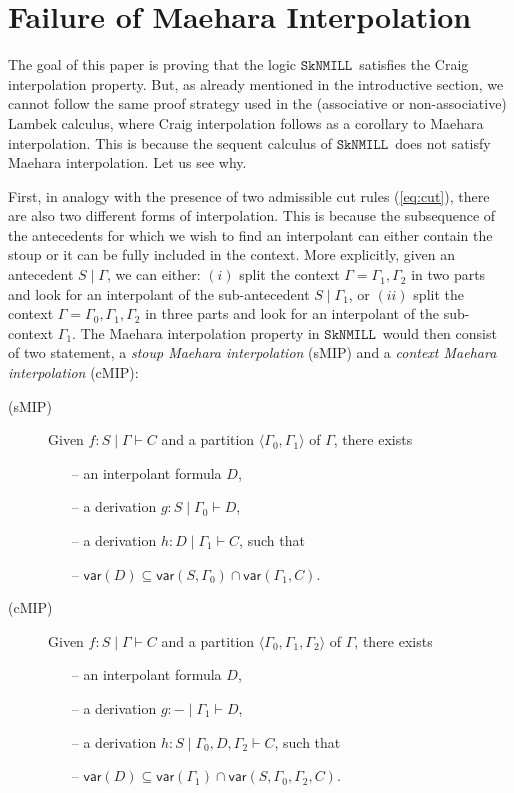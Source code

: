 \documentclass[sn-mathphys-num]{sn-jnl}%
\newcommand{\GG}{\Gamma}
\newcommand{\vd}{\vdash}
\newcommand{\SkNMILL}{$\mathtt{SkNMILL}$}
\newcommand{\mf}[1]{\mathsf{#1}}
\newcommand{\vars}[1]{\mf{var} (#1)}
\newcommand{\sMIP}{\textsf{sMIP}}
\newcommand{\cMIP}{\textsf{cMIP}}
\theoremstyle{thmstyleone}%
\theoremstyle{thmstyletwo}%
\theoremstyle{thmstylethree}%
\begin{document}
\section{Failure of Maehara Interpolation}\label{sec:failure}

The goal of this paper is proving that the logic \SkNMILL~satisfies the Craig interpolation property. But, as already mentioned in the introductive section, we cannot follow the same proof strategy used in the (associative or non-associative) Lambek calculus, where Craig interpolation follows as a corollary to Maehara interpolation. This is because the sequent calculus of \SkNMILL~does not satisfy Maehara interpolation. Let us see why.

First, in analogy with the presence of two admissible cut rules (\ref{eq:cut}), there are also two different forms of interpolation. This is because the subsequence of the antecedents for which we wish to find an interpolant can either contain the stoup or it can be fully included in the context. More explicitly, given an antecedent $S \mid \GG$, we can either: $(i)$ split the context $\GG = \GG_1,\GG_2$ in two parts and look for an interpolant of the sub-antecedent $S \mid \GG_1$, or $(ii)$ split the context $\GG = \GG_0,\GG_1,\GG_2$ in three parts and look for an interpolant of the sub-context $\GG_1$.
The Maehara interpolation property in \SkNMILL~would then consist of two statement, a \emph{stoup Maehara interpolation} (\sMIP) and a \emph{context Maehara interpolation} (\cMIP):
\begin{description}
  \item[(\sMIP)] Given $f: S \mid \GG \vd C$ and a partition $\langle \GG_0,\GG_1 \rangle$ of $\GG$, there exists  
  \begin{itemize}
    \item[--] an interpolant formula $D$,
    \item[--] a derivation $g : S \mid \GG_0 \vd D$,
    \item[--] a derivation $h : D \mid \GG_1 \vd C$, such that
    \item[--] $\vars{D} \subseteq \vars{S , \GG_0} \cap \vars{\GG_1 , C}$.
  \end{itemize}
  \item[(\cMIP)] Given $f: S \mid \GG \vd C$ and a partition $\langle \GG_0,\GG_1, \GG_2 \rangle$ of $\GG$, there exists  
  \begin{itemize}
    \item[--] an interpolant formula $D$,
    \item[--] a derivation $g : {-} \mid \GG_1 \vd D$,
    \item[--] a derivation $h : S \mid \GG_0, D, \GG_2 \vd C$, such that
    \item[--] $\vars{D} \subseteq \vars{\GG_1} \cap \vars{S , \GG_0 , \GG_2 , C}$.    
  \end{itemize}
\end{description}
\end{document}
